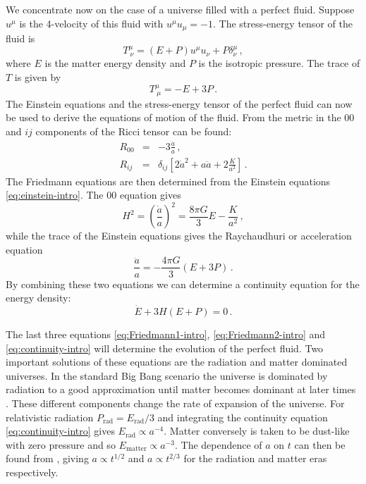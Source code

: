 We concentrate now on the case of a universe filled with a perfect
fluid. Suppose $u^\mu$ is the 4-velocity of this fluid with $u^\mu
u_\mu=-1$. The stress-energy tensor of the fluid is
% 
\begin{equation}
 \label{eq:fluidstress-intro}
  T^\mu_{~\nu} = (E + P)u^\mu u_\nu + P\delta^\mu_\nu \,,
\end{equation}
% 
where $E$ is the matter energy density and $P$ is the isotropic pressure.
The trace of $T$ is given by
% 
\begin{equation}
 \label{eq:Ttrace-intro}
  T^\mu_{~\mu} = -E + 3P\,.
\end{equation}
% 
The Einstein equations and the stress-energy tensor of the
perfect fluid can now be used to derive the equations of motion of the fluid.
From the metric in  the $00$ and $ij$ components of the
Ricci tensor can be found:
% 
\begin{eqnarray}
\label{eq:Ricci00-intro}
 R_{00} &=& -3 \frac{\ddot{a}}{a} \,,\\
\label{eq:Ricciij-intro}
 R_{ij} &=& \delta_{ij} \left[ 2\dot{a}^2 +
  a \ddot{a} + 2\frac{K}{a^2} \right] \,.
\end{eqnarray}
% 
The Friedmann equations are then determined from the Einstein equations
\eqref{eq:einstein-intro}.
The $00$ equation gives
% 
\begin{equation}
 \label{eq:Friedmann1-intro}
 H^2 = \left(\frac{\dot{a}}{a}\right)^2 = \frac{8\pi G}{3} E - \frac{K}{a^2}\,,
\end{equation}
% 
while the trace of the Einstein equations gives the Raychaudhuri or
acceleration equation
% 
\begin{equation}
 \label{eq:Friedmann2-intro}
 \frac{\ddot{a}}{a}  = -\frac{4\pi G}{3}(E + 3P)\,.
\end{equation}
% 
By combining these two equations we can determine a continuity equation for the
energy density:
\begin{equation}
 \label{eq:continuity-intro}
 \dot{E} + 3H(E+P) = 0 \,.
\end{equation}


The last three equations \eqref{eq:Friedmann1-intro},
\eqref{eq:Friedmann2-intro}
and \eqref{eq:continuity-intro} will determine the evolution of the
perfect fluid. Two important solutions of these equations are
the radiation and
matter dominated universes. In the standard Big Bang scenario the universe is
dominated by radiation to a good approximation until matter becomes dominant
at later times \cite{book:kolbturner}. These different components
change the rate of expansion
of the universe. For relativistic radiation $P_\mathrm{rad}=E_\mathrm{rad}/3$
and integrating the continuity equation \eqref{eq:continuity-intro} gives
$E_\mathrm{rad}\propto a^{-4}$. Matter conversely is taken to be dust-like with
zero
pressure and so $E_\mathrm{matter}\propto a^{-3}$. The dependence of $a$ on $t$
can then be
found from , giving $a\propto t^{1/2}$ and $a\propto
t^{2/3}$ for the radiation and matter eras respectively.


